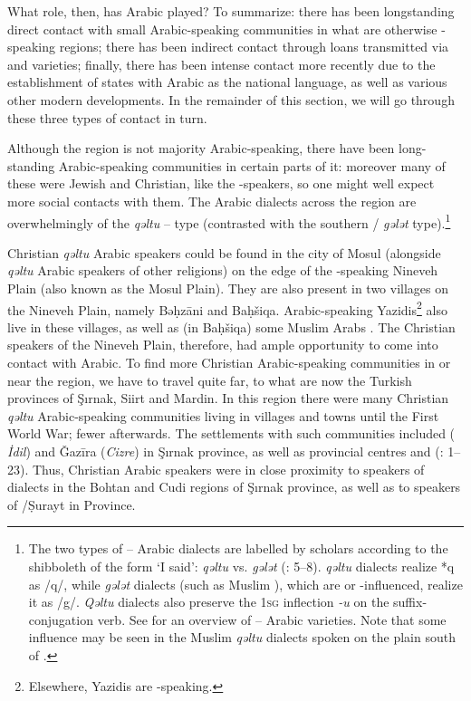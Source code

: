 \documentclass[output=paper]{langsci/langscibook}
\begin{document}
What role, then, has Arabic played? To summarize: there has been longstanding direct contact with small Arabic-speaking communities in what are otherwise -speaking regions; there has been indirect contact through loans transmitted via  and  varieties; finally, there has been intense contact more recently due to the establishment of states with Arabic as the national language, as well as various other modern developments. In the remainder of this section, we will go through these three types of contact in turn.

Although the region is not majority Arabic-speaking, there have been long-standing Arabic-speaking communities in certain parts of it: moreover many of these were Jewish and Christian, like the -speakers, so one might well expect more social contacts with them. The Arabic dialects across the region are overwhelmingly of the \textit{qəltu} – type (contrasted with the southern / \textit{gələt} type).\footnote{The two types of – Arabic dialects are labelled by scholars according to the shibboleth of the form ‘I said’: \textit{qəltu} vs. \textit{gələt} (\citealt{Blanc1964}: 5–8). \textit{qəltu} dialects realize *q as /q/, while \textit{gələt} dialects (such as Muslim ), which are  or -influenced, realize it as /g/. \textit{Qəltu} dialects also preserve the 1\textsc{sg} {inflection} \textit{-u} on the suffix-conjugation verb. See \citet{Talay2011} for an overview of -- Arabic varieties. Note that some  influence may be seen in the Muslim \textit{qəltu} dialects spoken on the plain south of  \citep[30]{Jastrow1978}.}

Christian \textit{qəltu} Arabic speakers could be found in the city of Mosul (alongside \textit{qəltu} Arabic speakers of other religions) on the edge of the -speaking Nineveh Plain (also known as the Mosul Plain). They are also present in two villages on the Nineveh Plain, namely Bəḥzāni and Baḥšiqa. Arabic-speaking Yazidis\footnote{Elsewhere, Yazidis are -speaking.} also live in these villages, as well as (in Baḥšiqa) some Muslim Arabs \citep[24]{Jastrow1978}. The Christian  speakers of the Nineveh Plain, therefore, had ample opportunity to come into contact with Arabic. To find more Christian Arabic-speaking communities in or near the  region, we have to travel quite far, to what are now the Turkish provinces of Şırnak, {Siirt} and {Mardin}. In this region there were many Christian \textit{qəltu} Arabic-speaking communities living in villages and towns until the First World War; fewer afterwards. The settlements with such communities included  ( \textit{İdil}) and Ǧazīra (\textit{Cizre}) in Şırnak province, as well as provincial centres  and  (\citealt{Jastrow1978}: 1–23). Thus, Christian Arabic speakers were in close proximity to speakers of  dialects in the Bohtan and Cudi regions of Şırnak province, as well as to speakers of /{Ṣurayt} in  Province.\largerpage
\end{document}
